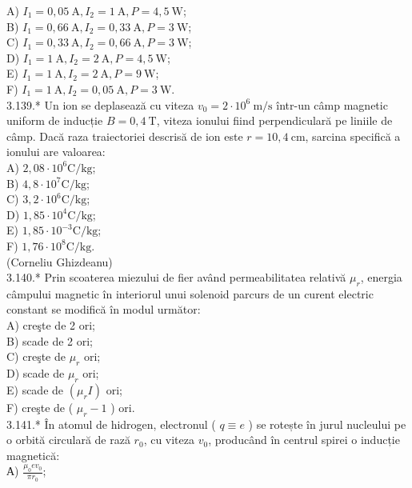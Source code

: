 \documentclass[10pt]{article}
\begin{document}
A) $I_{1}=0,05 \mathrm{~A}, I_{2}=1 \mathrm{~A}, P=4,5 \mathrm{~W}$;\\
B) $I_{1}=0,66 \mathrm{~A}, I_{2}=0,33 \mathrm{~A}, P=3 \mathrm{~W}$;\\
C) $I_{1}=0,33 \mathrm{~A}, I_{2}=0,66 \mathrm{~A}, P=3 \mathrm{~W}$;\\
D) $I_{1}=1 \mathrm{~A}, I_{2}=2 \mathrm{~A}, P=4,5 \mathrm{~W}$;\\
E) $I_{1}=1 \mathrm{~A}, I_{2}=2 \mathrm{~A}, P=9 \mathrm{~W}$;\\
F) $I_{1}=1 \mathrm{~A}, I_{2}=0,05 \mathrm{~A}, P=3 \mathrm{~W}$.\\
3.139.* Un ion se deplasează cu viteza $v_{0}=2 \cdot 10^{6} \mathrm{~m} / \mathrm{s}$ într-un câmp magnetic uniform de inducție $B=0,4 \mathrm{~T}$, viteza ionului fiind perpendiculară pe liniile de câmp. Dacă raza traiectoriei descrisă de ion este $r=10,4 \mathrm{~cm}$, sarcina specifică a ionului are valoarea:\\
A) $2,08 \cdot 10^{6} \mathrm{C} / \mathrm{kg}$;\\
B) $4,8 \cdot 10^{7} \mathrm{C} / \mathrm{kg}$;\\
C) $3,2 \cdot 10^{6} \mathrm{C} / \mathrm{kg}$;\\
D) $1,85 \cdot 10^{4} \mathrm{C} / \mathrm{kg}$;\\
E) $1,85 \cdot 10^{-3} \mathrm{C} / \mathrm{kg}$;\\
F) $1,76 \cdot 10^{8} \mathrm{C} / \mathrm{kg}$.\\
(Corneliu Ghizdeanu)\\
3.140.* Prin scoaterea miezului de fier având permeabilitatea relativă $\mu_{r}$, energia câmpului magnetic în interiorul unui solenoid parcurs de un curent electric constant se modifică în modul următor:\\
A) creşte de 2 ori;\\
B) scade de 2 ori;\\
C) creşte de $\mu_{r}$ ori;\\
D) scade de $\mu_{r}$ ori;\\
E) scade de $\left(\mu_{r} I\right)$ ori;\\
F) creşte de ( $\mu_{r}-1$ ) ori.\\
3.141.* În atomul de hidrogen, electronul ( $q \equiv e$ ) se rotește în jurul nucleului pe o orbită circulară de rază $r_{0}$, cu viteza $v_{0}$, producând în centrul spirei o inducție magnetică:\\
А) $\frac{\mu_{0} e v_{0}}{\pi r_{0}}$;\\
\end{document}
